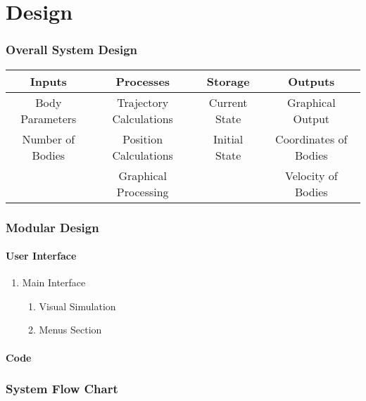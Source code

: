\part{Design}

\section{Overall System Design}

\begin{tabular}{|c|c|c|c|}
	\hline
	Inputs & Processes & Storage & Outputs \\ \hline
	Body Parameters & Trajectory Calculations 
		& Current State & Graphical Output \\
	Number of Bodies & Position Calculations 
		& Initial State & Coordinates of Bodies \\ 
	& Graphical Processing && Velocity of Bodies \\\hline
	

	
\end{tabular}

\section{Modular Design}

\subsection{User Interface}

\begin{enumerate}
	\item Main Interface
		\begin{enumerate}
			\item Visual Simulation
			\item Menus Section
				
		\end{enumerate}	
\end{enumerate}

\subsection{Code}

\section{System Flow Chart}

